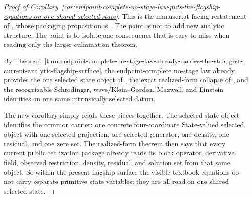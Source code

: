 \begin{proof}[Proof of Corollary~\ref{cor:endpoint-complete-no-stage-law-puts-the-flagship-equations-on-one-shared-selected-state}]
\label{proof:cor:endpoint-complete-no-stage-law-puts-the-flagship-equations-on-one-shared-selected-state}
This is the manuscript-facing restatement of
, whose
packaging proposition is
. The point is not to add new
analytic structure. The point is to isolate one consequence that is easy to
miss when reading only the larger culmination theorem.

By Theorem~\ref{thm:endpoint-complete-no-stage-law-already-carries-the-strongest-current-analytic-flagship-surface},
the endpoint-complete no-stage law already provides the one selected state
object of
, the
exact realized-form collapse of
, and
the recognizable Schr\"odinger, wave/Klein--Gordon, Maxwell, and Einstein
identities on one same intrinsically selected datum.

The new corollary simply reads these pieces together. The selected state
object identifies the common carrier: one concrete four-coordinate
\(\mathrm{State}\)-valued selected object with one selected projection, one
selected generator, one density, one residual, and one zero set. The
realized-form theorem then says that every current public realization package
already reads its block operator, derivative field, observed restriction,
density, residual, and solution set from that same object. So within the
present flagship surface the visible textbook equations do not carry separate
primitive state variables; they are all read on one shared selected state.
\end{proof}


